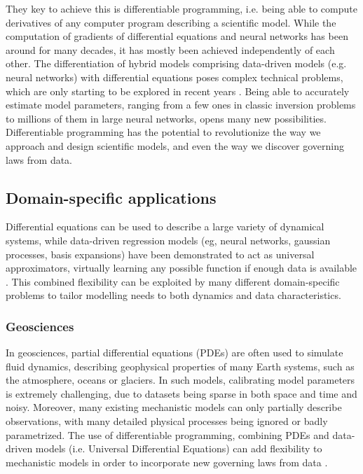 They key to achieve this is differentiable programming, i.e. being able to compute derivatives of any computer program describing a scientific model.
While the computation of gradients of differential equations and neural networks has been around for many decades, it has mostly been achieved independently of each other. 
The differentiation of hybrid models comprising data-driven models (e.g. neural networks) with differential equations poses complex technical problems, which are only starting to be explored in recent years \cite{ma_comparison_2021}. 
Being able to accurately estimate model parameters, ranging from a few ones in classic inversion problems to millions of them in large neural networks, opens many new possibilities. 
Differentiable programming has the potential to revolutionize the way we approach and design scientific models, and even the way we discover governing laws from data. 

\subsection{Domain-specific applications}

Differential equations can be used to describe a large variety of dynamical systems, while data-driven regression models (eg, neural networks, gaussian processes, basis expansions) have been demonstrated to act as universal approximators, virtually learning any possible function if enough data is available \cite{gorban_1998}. 
This combined flexibility can be exploited by many different domain-specific problems to tailor modelling needs to both dynamics and data characteristics.

\subsubsection{Geosciences}

In geosciences, partial differential equations (PDEs) are often used to simulate fluid dynamics, describing geophysical properties of many Earth systems, such as the atmosphere, oceans or glaciers.
In such models, calibrating model parameters is extremely challenging, due to datasets being sparse in both space and time and noisy.
Moreover, many existing mechanistic models can only partially describe observations, with many detailed physical processes being ignored or badly parametrized. 
The use of differentiable programming, combining PDEs and data-driven models (i.e. Universal Differential Equations) can add flexibility to mechanistic models in order to incorporate new governing laws from data \cite{rackauckas2020universal}.

